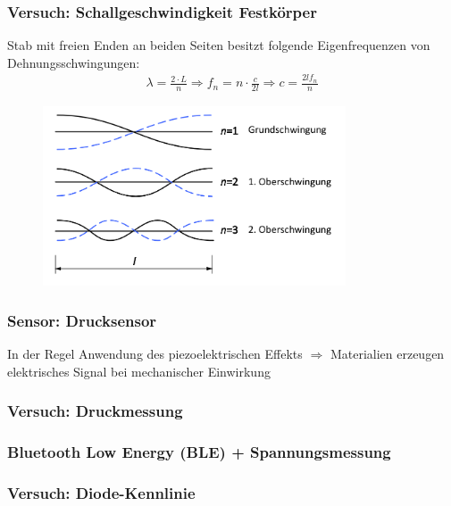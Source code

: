 \documentclass{beamer}
\begin{document}
\begin{frame}
    \frametitle{Versuch: Schallgeschwindigkeit Festkörper}
    Stab mit freien Enden an beiden Seiten besitzt folgende Eigenfrequenzen von Dehnungsschwingungen:
    \begin{align*}
        \lambda = \frac{2 \cdot L}{n} \Rightarrow f_n = n \cdot \frac{c}{2l} \Rightarrow c=\frac{2lf_n}{n}
    \end{align*}
    \begin{figure}[htpb]
        \centering
        \includegraphics[width=0.8\textwidth]{eigenfrequenzen}
    \end{figure}

\end{frame}

\begin{frame}
    \frametitle{Sensor: Drucksensor}
    In der Regel Anwendung des piezoelektrischen Effekts $\Rightarrow$ Materialien erzeugen elektrisches Signal bei mechanischer Einwirkung
\end{frame}

\begin{frame}
    \frametitle{Versuch: Druckmessung}
\end{frame}
\begin{frame}
    \frametitle{Bluetooth Low Energy (BLE) + Spannungsmessung}
\end{frame}

\begin{frame}
    \frametitle{Versuch: Diode-Kennlinie}
\end{frame}
\end{document}
